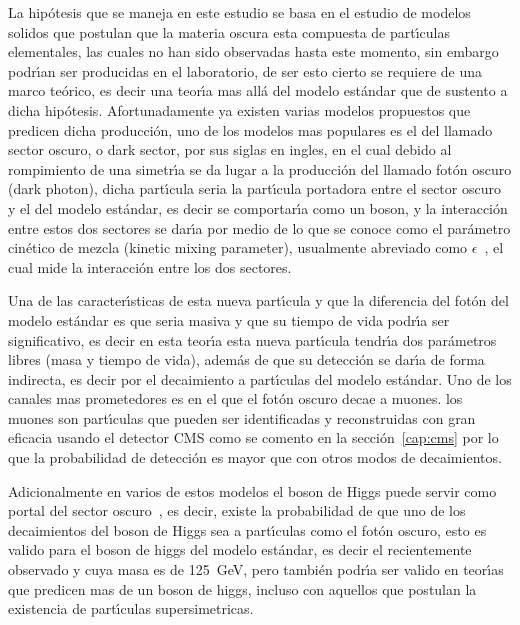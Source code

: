 La hip\'otesis que se maneja en este estudio se basa en el estudio de modelos solidos que postulan que la materia oscura esta compuesta de part\'{\i}culas elementales, las cuales no han sido observadas hasta este momento, sin embargo podr\'{\i}an ser producidas en el laboratorio, de ser esto cierto se requiere de una marco te\'orico, es decir una teor\'{\i}a mas all\'a del modelo est\'andar que de sustento a dicha hip\'otesis. Afortunadamente ya existen varias modelos propuestos que predicen dicha producci\'on, uno de los modelos mas populares es el del llamado sector oscuro, o dark sector, por sus siglas en ingles, en el cual debido al rompimiento de una simetr\'{\i}a se da lugar a la producci\'on del llamado fot\'on oscuro (dark photon), dicha part\'{\i}cula seria la part\'{\i}cula portadora entre el sector oscuro y el del modelo est\'andar, es decir se comportar\'{\i}a como un boson, y la interacci\'on entre estos dos sectores se dar\'{\i}a por medio de lo que se conoce como el par\'ametro cin\'etico de mezcla (kinetic mixing parameter), usualmente abreviado como $\epsilon$~\cite{LB}, el cual mide la interacci\'on entre los dos sectores.

Una de las caracter\'{\i}sticas de esta nueva part\'{\i}cula y que la diferencia del fot\'on del modelo est\'andar es que seria masiva y que su tiempo de vida podr\'{\i}a ser significativo, es decir en esta teor\'{\i}a esta nueva part\'{\i}cula tendr\'{\i}a dos par\'ametros libres (masa y tiempo de vida), adem\'as de que su detecci\'on se dar\'{\i}a de forma indirecta, es decir por el decaimiento a part\'{\i}culas del modelo est\'andar.  Uno de los canales mas prometedores es en el que el fot\'on oscuro decae a muones. los muones son part\'{\i}culas que pueden ser identificadas y reconstruidas con gran eficacia usando el detector CMS como se comento en la secci\'on~\ref{cap:cms} por lo que la probabilidad de detecci\'on es mayor que con otros modos de decaimientos.

Adicionalmente en varios de estos modelos el boson de Higgs puede servir como portal del sector oscuro~\cite{Arcadi:2019lka}, es decir, existe la probabilidad de que uno de los decaimientos del boson de Higgs sea a part\'{\i}culas como el fot\'on oscuro, esto es valido para el boson de higgs del modelo est\'andar, es decir el recientemente observado y cuya masa es de 125~GeV, pero tambi\'en podr\'{\i}a ser valido en teor\'{\i}as que predicen mas de un boson de higgs, incluso con aquellos que postulan la existencia de part\'{\i}culas supersimetricas.




